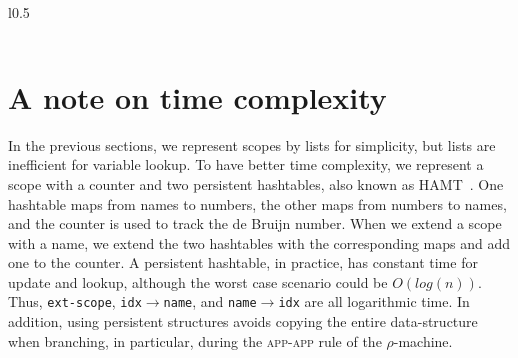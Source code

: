 \documentclass[a4paper,UKenglish]{lipics-v2016}
\newcommand{\clos}[2] {
  \langle #1; #2 \rangle
}
\newcommand{\app}[2] {
  (#1\, #2)
}
\newcommand{\pr}[2] {
 (#1\, #2)
}
\newcommand{\bd}[2] {
 #1/ #2
}
\newcommand*{\transname}[1]{\textsc{#1}}
\begin{document}
\begin{wrapfigure}{l}{0.5\textwidth}
\begin{minipage}[b]{0.4\textwidth}
\begin{tabular}{l}

  \end{tabular}
  \end{minipage}
\end{wrapfigure}

\section{A note on time complexity}
    \label{efficiency}

In the previous sections, we represent scopes by lists for simplicity,
but lists are inefficient for variable lookup.  To have better time
complexity, we represent a scope with a counter and two persistent
hashtables, also known as HAMT~\citep{bagwell_ideal_2001}.  One
hashtable maps from names to numbers, the other maps from numbers to
names, and the counter is used to track the de Bruijn number.  When we
extend a scope with a name, we extend the two hashtables with the
corresponding maps and add one to the counter.  A persistent
hashtable, in practice, has constant time for update and lookup,
although the worst case scenario could be $O(log(n))$.  Thus,
\texttt{ext-scope}, \texttt{idx$\rightarrow$name}, and
\texttt{name$\rightarrow$idx} are all logarithmic time.  In addition,
using persistent structures avoids copying the entire data-structure
when branching, in particular, during the \transname{app-app} rule of
the $\rho$-machine.
\end{document}
